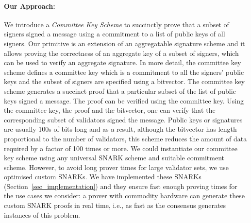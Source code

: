 \paragraph{Our Approach:} We introduce a {\em Committee Key Scheme} to succinctly prove that a subset of signers
signed a message using a commitment to a list of public keys of all signers. Our primitive is an extension of an aggregatable signature scheme and it allows proving the correctness of an aggregate key of a subset of signers, which can be used to verify an aggregate signature.
In more detail, the committee key scheme defines a committee key which is a commitment to all the signers' public keys and the subset of signers are specified using a bitvector.
The committee key  scheme generates a succinct proof that a particular subset of the list of public keys signed a message. The proof can be verified using the committee key.
Using the committee key, the proof and the bitvector, one can verify that the corresponding subset of validators signed the message.
Public keys or signatures are usually 100s of bits long and as a result, although the bitvector has length proportional to the number of validators, this scheme reduces the amount of
data required by a factor of 100 times or more. We could instantiate our committee key scheme using any universal SNARK scheme and suitable commitment scheme.
However, to avoid long prover times for large validator sets, we use optimised custom SNARKs. We have implemented these SNARKs
(Section~\ref{sec_implementation}) and they ensure fast enough proving times for the use cases we consider: a prover with
commodity hardware can generate these custom SNARK proofs in real time, i.e., as fast as the consensus generates instances of this problem.

\vspace{-0.2cm}
